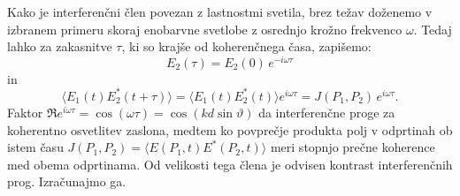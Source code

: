Kako je interferenčni člen povezan z lastnostmi svetila, brez težav
doženemo v izbranem primeru skoraj enobarvne svetlobe z osrednjo krožno frekvenco
$\omega$. Tedaj lahko za zakasnitve $\tau$, ki so krajše
od koherenčnega časa, zapišemo: 
\begin{equation}
E_{2}(\tau)=E_{2}(0)\, e^{-i\omega\tau}
\end{equation}
 in 
\begin{equation}
\langle E_{1}(t)E_{2}^{*}(t+\tau)\rangle=
\langle E_{1}(t)E_{2}^{*}(t)\rangle 
e^{i\omega\tau}=J(P_{1},P_{2})\, e^{i\omega\tau}.
\end{equation}
Faktor $\Re e^{i\omega\tau}= \cos(\omega \tau) = \cos(kd\sin\vartheta)$ da interferenčne
proge za koherentno osvetlitev zaslona, medtem ko povprečje produkta polj
v odprtinah ob istem času $J(P_{1},P_{2})=\langle E(P_{1},t)E^{*}(P_{2},t)\rangle$
meri stopnjo prečne koherence med obema odprtinama. Od velikosti
tega člena je odvisen kontrast interferenčnih prog. Izračunajmo ga.

